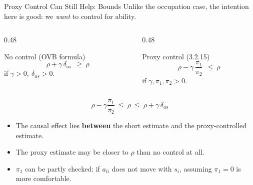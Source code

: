 \documentclass[aspectratio=169,11pt]{beamer}
\begin{document}
\begin{frame}{Proxy Control Can Still Help: Bounds}
\small
Unlike the occupation case, the intention here is good: we \emph{want} to control for ability.
\medskip
\begin{columns}[T]
\begin{column}{0.48\textwidth}
\begin{block}{No control (OVB formula)}
\vspace{-0.4em}
\[
\rho+\gamma\,\delta_{as}\ \ \ge\ \rho
\]
if $\gamma>0,\ \delta_{as}>0$.
\end{block}
\end{column}
\begin{column}{0.48\textwidth}
\begin{block}{Proxy control (3.2.15)}
\vspace{-0.4em}
\[
\rho-\gamma\,\frac{\pi_1}{\pi_2}\ \ \le\ \rho
\]
if $\gamma,\pi_1,\pi_2>0$.
\end{block}
\end{column}
\end{columns}
\medskip
\[
\boxed{\rho-\gamma\frac{\pi_1}{\pi_2}\ \le\ \rho\ \le\ \rho+\gamma\,\delta_{as}}
\]
\begin{itemize}
\setlength{\itemsep}{0.4em}
\item The causal effect lies \textbf{between} the short estimate and the proxy-controlled estimate.
\item The proxy estimate may be closer to $\rho$ than no control at all.
\item $\pi_1$ can be partly checked: if $a_{li}$ does not move with $s_i$, assuming $\pi_1=0$ is more comfortable.
\end{itemize}
\end{frame}
\end{document}
